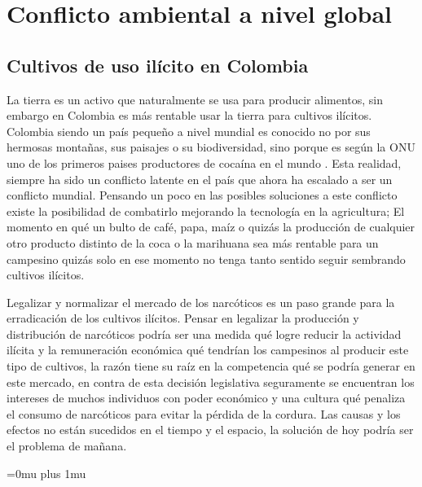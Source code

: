 \documentclass[a4paper,man,natbib]{apa6}
\begin{document}
\section{Conflicto ambiental a nivel global}
\subsection{Cultivos de uso ilícito en Colombia}

La tierra es un activo que naturalmente se usa para producir alimentos, sin embargo en Colombia es más rentable usar la tierra para cultivos ilícitos. Colombia siendo un país pequeño a nivel mundial es conocido no por sus hermosas montañas, sus paisajes o su biodiversidad, sino porque es según la ONU uno de los primeros paises productores de cocaína en el mundo \citep{Informed31:online}. Esta realidad, siempre ha sido un conflicto latente en el país que ahora ha escalado a ser un conflicto mundial. Pensando un poco en las posibles soluciones a este conflicto existe la posibilidad de combatirlo mejorando la tecnología en la agricultura; El momento en qué un bulto de café,  papa, maíz o quizás la producción de cualquier otro producto distinto de la coca o la marihuana sea más rentable para un campesino quizás solo en ese momento no tenga tanto sentido seguir sembrando cultivos ilícitos.\newline

Legalizar y normalizar el mercado de los narcóticos es un paso grande para la erradicación de los cultivos ilícitos. Pensar en legalizar la producción y distribución de narcóticos podría ser una medida qué logre reducir la actividad ilícita y la remuneración económica qué tendrían los campesinos al producir este tipo de cultivos, la razón tiene su raíz en la competencia qué se podría generar en este mercado, en contra de esta decisión legislativa seguramente se encuentran los intereses de muchos individuos con poder económico y una cultura qué penaliza el consumo de narcóticos para evitar la pérdida de la cordura. Las causas y los efectos no están sucedidos en el tiempo y el espacio, la solución de hoy podría ser el problema de mañana.\newline


\Urlmuskip=0mu plus 1mu\relax


\end{document}
